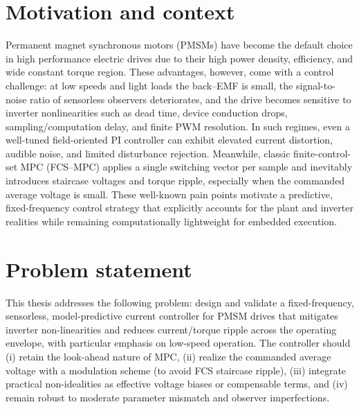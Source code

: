 \graphicspath{{./Chapters/CH1/Pictures/}}
\label {ch:Intro}
\let\cleardoublepage\clearpage
\label{ch:introduction}

\section{Motivation and context}
Permanent magnet synchronous motors (PMSMs) have become the default choice in high performance electric drives due to their high power density, efficiency, and wide constant torque region. These advantages, however, come with a control challenge: at low speeds and light loads the back–EMF is small, the signal-to-noise ratio of sensorless observers deteriorates, and the drive becomes sensitive to inverter non\-linearities such as dead time, device conduction drops, sampling/computation delay, and finite PWM resolution. In such regimes, even a well-tuned field-oriented PI controller can exhibit elevated current distortion, audible noise, and limited disturbance rejection. Meanwhile, classic finite-control-set MPC (FCS–MPC) applies a single switching vector per sample and inevitably introduces staircase voltages and torque ripple, especially when the commanded average voltage is small. These well-known pain points motivate a predictive, fixed-frequency control strategy that explicitly accounts for the plant and inverter realities while remaining computationally lightweight for embedded execution.

\section{Problem statement}
This thesis addresses the following problem: design and validate a fixed-frequency, sensorless, model-predictive current controller for PMSM drives that mitigates inverter non-linearities and reduces current/torque ripple across the operating envelope, with particular emphasis on low-speed operation. The controller should
(i) retain the look-ahead nature of MPC,
(ii) realize the commanded average voltage with a modulation scheme (to avoid FCS staircase ripple),
(iii) integrate practical non-idealities as effective voltage biases or compensable terms, and
(iv) remain robust to moderate parameter mismatch and observer imperfections.

